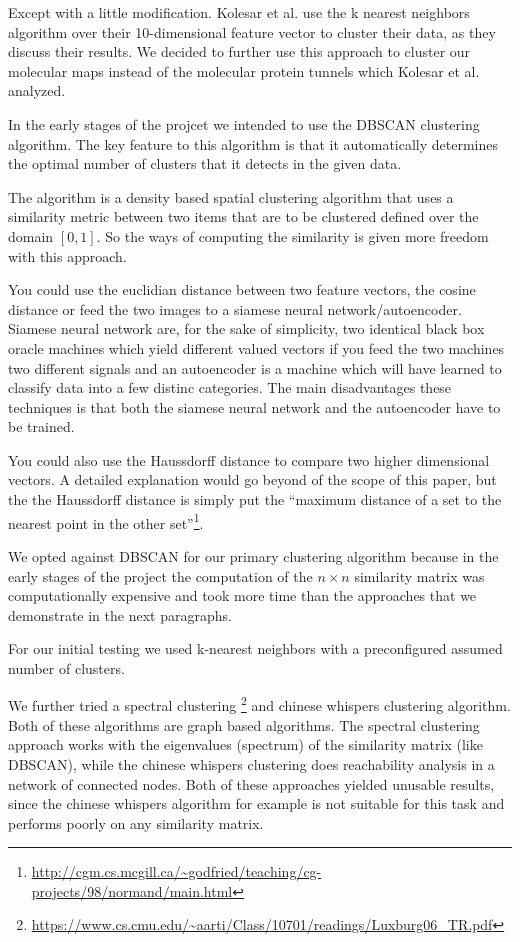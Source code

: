 \documentclass[journal]{vgtc}       %
\begin{document}
Except with a little modification. Kolesar et al. \cite{kolesar} use the k nearest neighbors algorithm over their 10-dimensional feature vector to cluster their data, as they discuss their results. We decided to further use this approach to cluster our molecular maps instead of the molecular protein tunnels which Kolesar et al. analyzed.


In the early stages of the projcet we intended to use the DBSCAN clustering algorithm. 
The key feature to this algorithm is that it automatically determines the optimal number of clusters that it detects in the given data. 

The algorithm is a density based spatial clustering algorithm that uses a similarity metric between two items that are to be  clustered defined over the domain \([0,1]\). So the ways of computing the similarity is given more freedom with this approach.

You could use the euclidian distance between two feature vectors, the cosine distance or feed the two images to a siamese neural network/autoencoder. Siamese neural network are, for the sake of simplicity, two identical black box oracle machines which yield different valued vectors if you feed the two machines two different signals and  an autoencoder is a machine which will have learned to classify data into a few distinc categories. The main disadvantages these techniques is that both the siamese neural network and the autoencoder have to be trained. 

You could also use the Haussdorff distance to compare two higher dimensional vectors. A detailed explanation would go beyond of the scope of this paper, but the the Haussdorff distance is simply put the ``maximum distance of a set to the nearest point in the other set''\footnote{\url{http://cgm.cs.mcgill.ca/~godfried/teaching/cg-projects/98/normand/main.html}}.

We opted against DBSCAN for our primary clustering algorithm because in the early stages of the project the computation of the \(n\times n\) similarity matrix was  computationally expensive and took more time than the approaches that we demonstrate in the next paragraphs.

For our initial testing we used k-nearest neighbors with a preconfigured assumed number of clusters.

We further tried  a  spectral clustering  \footnote{\url{https://www.cs.cmu.edu/~aarti/Class/10701/readings/Luxburg06_TR.pdf}} and chinese whispers clustering algorithm\cite{chinesewhispers}. Both of these algorithms are graph based algorithms. The spectral clustering approach works with the eigenvalues (spectrum) of the similarity matrix (like DBSCAN), while the chinese whispers clustering does reachability analysis in a network of connected nodes.
Both of these approaches yielded unusable results, since the chinese whispers algorithm for example  is not suitable for this task and performs poorly on any similarity matrix.
\end{document}
